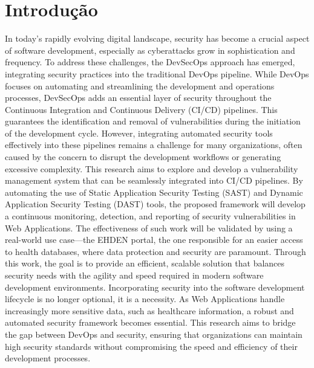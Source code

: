 \chapter{Introdução}%
\label{chapter:introduction}


\begin{introduction}
\end{introduction}

In today’s rapidly evolving digital landscape, security has become a crucial aspect of software development, especially as cyberattacks grow in sophistication and frequency. To address these challenges, the DevSecOps approach has emerged, integrating security practices into the traditional DevOps pipeline. While DevOps focuses on automating and streamlining the development and operations processes, DevSecOps adds an essential layer of security throughout the Continuous Integration and Continuous Delivery (CI/CD) pipelines. This guarantees the identification and removal of vulnerabilities during the initiation of the development cycle. However, integrating automated security tools effectively into these pipelines remains a challenge for many organizations, often caused by the concern to disrupt the development workflows or generating excessive complexity.
This research aims to explore and develop a vulnerability management system that can be seamlessly integrated into CI/CD pipelines. By automating the use of Static Application Security Testing (SAST) and Dynamic Application Security Testing (DAST) tools, the proposed framework will develop a continuous monitoring, detection, and reporting of security vulnerabilities in Web Applications. The effectiveness of such work will be validated by using a real-world use case—the EHDEN portal, the one responsible for an easier access to health databases, where data protection and security are paramount. Through this work, the goal is to provide an efficient, scalable solution that balances security needs with the agility and speed required in modern software development environments.
Incorporating security into the software development lifecycle is no longer optional, it is a necessity. As Web Applications handle increasingly more sensitive data, such as healthcare information, a robust and automated security framework becomes essential. This research aims to bridge the gap between DevOps and security, ensuring that organizations can maintain high security standards without compromising the speed and efficiency of their development processes.



